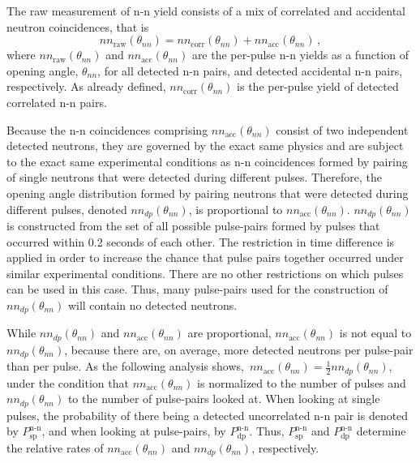 The raw measurement of n-n yield consists of a mix of correlated and accidental neutron coincidences, that is
\begin{equation}
\label{eq:corr_uncorr}
nn_{\text{raw}}(\theta_{nn})= nn_{\text{corr}}(\theta_{nn}) + nn_{\text{acc}}(\theta_{nn}) \, ,
\end{equation}
where $nn_{\text{raw}}(\theta_{nn})$ and $nn_{\text{acc}}(\theta_{nn})$ are the per-pulse n-n yields as a function of opening angle, $\theta_{nn}$, for all detected n-n pairs, and detected accidental n-n pairs, respectively. As already defined, $ nn_{\text{corr}}(\theta_{nn})$ is the per-pulse yield of detected correlated n-n pairs.

Because the n-n coincidences comprising $nn_{\text{acc}}(\theta_{nn})$ consist of two independent detected neutrons, they are governed by the exact same physics and are subject to the exact same experimental conditions as n-n coincidences formed by pairing of single neutrons that were detected during different pulses.
Therefore, the opening angle distribution formed by pairing neutrons that were detected during different pulses, denoted $nn_{dp}(\theta_{nn})$, is proportional to $nn_{\text{acc}}(\theta_{nn})$.
$nn_{dp}(\theta_{nn})$ is constructed from the set of all possible pulse-pairs formed by pulses that occurred within 0.2 seconds of each other.
The restriction in time difference is applied in order to increase the chance that pulse pairs together occurred under similar experimental conditions.
There are no other restrictions on which pulses can be used in this case.
Thus, many pulse-pairs used for the construction of $nn_{dp}(\theta_{nn})$ will contain no detected neutrons.

While $nn_{dp}(\theta_{nn})$ and $nn_{\text{acc}}(\theta_{nn})$ are proportional, $nn_{\text{acc}}(\theta_{nn})$ is not equal to $nn_{dp}(\theta_{nn})$,  because there are, on average, more detected neutrons per pulse-pair than per pulse.
As the following analysis shows,~$nn_{\text{acc}}(\theta_{nn}) = \frac{1}{2}nn_{dp}(\theta_{nn})$, under the condition that $nn_{\text{acc}}(\theta_{nn})$ is normalized to the number of pulses and $nn_{dp}(\theta_{nn})$ to the number of pulse-pairs looked at.
When looking at single pulses, the probability of there being a detected uncorrelated n-n pair is denoted by $P^{\text{n-n}}_{\text{sp}}$, and when looking at pulse-pairs, by $P^{\text{n-n}}_{\text{dp}}$.
Thus, $P^{\text{n-n}}_{\text{sp}}$ and $P^{\text{n-n}}_{\text{dp}}$ determine the relative rates of $nn_{\text{acc}}(\theta_{nn})$ and $nn_{dp}(\theta_{nn})$, respectively.

